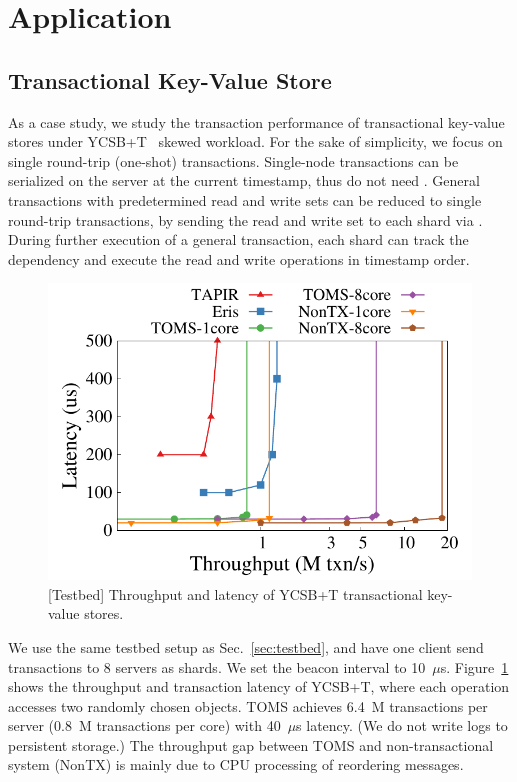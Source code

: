 \section{Application}
\label{sec:application}

\subsection{Transactional Key-Value Store}
\label{subsec:eval-kvs}


As a case study, we study the transaction performance of transactional key-value stores under YCSB+T~\cite{dey2014ycsbt} skewed workload.
For the sake of simplicity, we focus on single round-trip (one-shot) transactions. Single-node transactions can be serialized on the server at the current timestamp, thus do not need \sys. General transactions with predetermined read and write sets can be reduced to single round-trip transactions, by sending the read and write set to each shard via \sys. During further execution of a general transaction, each shard can track the dependency and execute the read and write operations in timestamp order.




\begin{figure}[t]
\centering
\includegraphics[width=.45\textwidth]{gnuplot/ycsb.pdf}
\caption{[Testbed] Throughput and latency of YCSB+T transactional key-value stores.}
\label{fig:ycsb}
\end{figure}


We use the same testbed setup as Sec.~\ref{sec:testbed}, and have one \sys client send transactions to 8 \sys servers as shards. We set the beacon interval to 10~$\mu$s.
Figure~\ref{fig:ycsb} shows the throughput and transaction latency of YCSB+T, where each operation accesses two randomly chosen objects.
TOMS achieves 6.4~M transactions per server (0.8~M transactions per core) with 40~$\mu$s latency. (We do not write logs to persistent storage.)
The throughput gap between TOMS and non-transactional system (NonTX) is mainly due to CPU processing of reordering messages.

